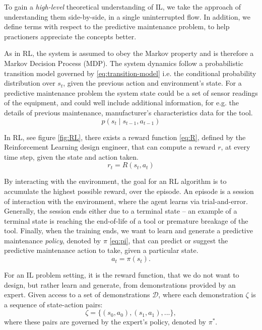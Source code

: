 \documentclass{article}
\begin{document}
To gain a \textit{high-level} theoretical understanding of IL, we take the approach of understanding them side-by-side, in a single uninterrupted flow. In addition, we define terms with respect to the predictive maintenance problem, to help practioners appreciate the concepts better. 

As in RL, the system is assumed to obey the Markov property and is therefore a Markov Decision Process (MDP). The system dynamics follow a probabilistic transition model governed by \eqref{eq:transition-model} i.e. the conditional probability distribution over $s_t$, given the previous action and environment's state. For a predictive maintenance problem the system state could be a set of sensor readings of the equipment, and could well include additional information, for e.g. the details of previous maintenance, manufacturer's characteristics data for the tool.
\begin{equation}\label{eq:transition-model}
	p(s_t \mid s_{t-1}, a_{t-1})
\end{equation}

In RL, see figure \ref{fig:RL}, there exists a reward function \eqref{eq:R}, defined by the Reinforcement Learning design engineer, that can compute a reward $r$, at every time step, given the state and action taken.
\begin{equation}\label{eq:R}
	r_t = R(s_t, a_t)
\end{equation}

By interacting with the environment, the goal for an RL algorithm is to accumulate the highest possible reward, over the episode. An episode is a session of interaction with the environment, where the agent learns via trial-and-error. Generally, the session ends either due to a terminal state -- an example of a terminal state is reaching the end-of-life of a tool or premature breakage of the tool. Finally, when the training ends, we want to learn and generate a predictive maintenance \textit{policy}, denoted by $\pi$ \eqref{eq:pi}, that can predict or suggest the predictive maintenance action to take, given a particular state.
\begin{equation}\label{eq:pi}
	a_t = \pi(s_t).
\end{equation}

For an IL problem setting, it is the reward function, that we do not want to design, but rather learn and generate, from demonstrations provided by an expert. Given access to a set of demonstrations $\mathcal{D}$, where each demonstration $\zeta$ is a sequence of state-action pairs:
\begin{equation}\label{eq:demo}
	\zeta = \{(s_0, a_0), (s_1, a_1), ...\},
\end{equation}
where these pairs are governed by the expert's policy, denoted by $\pi^{*}$.
\end{document}
